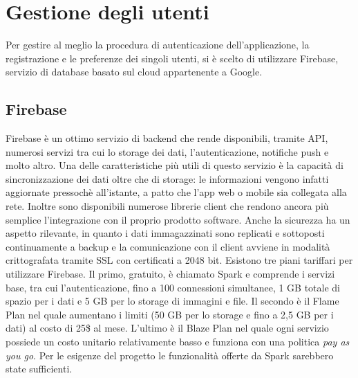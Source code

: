\chapter{Gestione degli utenti}
Per gestire al meglio la procedura di autenticazione dell'applicazione, la
registrazione e le preferenze dei singoli utenti, si è scelto di utilizzare
Firebase, servizio di database basato sul cloud appartenente a Google.

\section{Firebase}
Firebase è un ottimo servizio di backend che rende disponibili, tramite API,
numerosi servizi tra cui lo storage dei dati, l'autenticazione, notifiche push e
molto altro. Una delle caratteristiche più utili di questo servizio è la
capacità di sincronizzazione dei dati oltre che di storage: le informazioni
vengono infatti aggiornate pressochè all'istante, a patto che l'app web o mobile
sia collegata alla rete. Inoltre sono disponibili numerose librerie client che
rendono ancora più semplice l'integrazione con il proprio prodotto software.
Anche la sicurezza ha un aspetto rilevante, in quanto i dati immagazzinati sono
replicati e sottoposti continuamente a backup e la comunicazione con il client
avviene in modalità crittografata tramite SSL con certificati a 2048 bit.
Esistono tre piani tariffari per utilizzare Firebase. Il primo, gratuito, è
chiamato Spark e comprende i servizi base, tra cui l'autenticazione, fino a 100
connessioni simultanee, 1 GB totale di spazio per i dati e 5 GB per lo storage
di immagini e file. Il secondo è il Flame Plan nel quale aumentano i limiti (50
GB per lo storage e fino a 2,5 GB per i dati) al costo di 25\$ al mese.
L'ultimo è il Blaze Plan nel quale ogni servizio possiede un costo unitario
relativamente basso e funziona con una politica \textit{pay as you go}. Per le
esigenze del progetto le funzionalità offerte da Spark sarebbero state
sufficienti.

